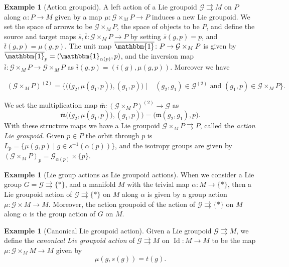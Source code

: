 \documentclass[12pt,a4paper,reqno]{amsart}
\DeclareMathOperator{\Id}{Id}
\newcommand{\1}{\mathbbm{1}} %
\newcommand{\G}{\mathcal{G}} %
\newcommand{\m}{\mathfrak{m}} %
\theoremstyle{definition}
\newtheorem{example}[thm]{Example}
\theoremstyle{TheoremNum}
\begin{document}
\begin{example}[Action groupoid]
A left action of a Lie groupoid $\G\rightrightarrows M$ on $P$ along $\alpha\colon P\to M$ given by a map $\mu\colon \G\times_M P\to P$ induces a new Lie groupoid. We set the space of arrows to be $\G\times_M P$, the space of objects to be $P$, and define the source and target maps $\overline{s},\overline{t}\colon \G\times_M P\to P$ by setting $\overline{s}(g,p) = p$, and $\overline{t}(g,p) =\mu(g,p)$. The unit map $\overline{\1}\colon P\to \G\times_M P$ is given by $\overline{\1}_p = (\1_{\alpha(p)},p)$, and the inversion map $\overline{i}\colon \G\times_M P\to \G\times_M P$ as $\overline{i}(g,p) = (i(g),\mu(g,p))$. Moreover we have
\begin{linenomath}
\begin{align*}
(\G\times_M P)^{(2)} = \bigg\{\Big(\big(g_2,\mu(g_1,p)\big),(g_1,p)\Big)\mid& (g_2,g_1) \in \G^{(2)}\mbox{ and } (g_1,p)\in \G\times_M P\bigg\}. 
\end{align*}
\end{linenomath}

We set the multiplication map $\overline{\m}\colon(\G\times_M P)^{(2)}\to \G$ as 
\[
\overline{\m}\Big(\big(g_2,\mu(g_1,p)\big),(g_1,p)\Big) = \big(\m(g_2,g_1),p\big).
\] 
With these structure maps we have a Lie groupoid $\G\times_M P\rightrightarrows P$, called the \emph{action Lie groupoid}. Given $p\in P$ the orbit through $p$ is $L_p = \{\mu(g,p)\mid g\in s^{-1}(\alpha(p))\}$, and the isotropy groups are given by $(\G\times_M P)_p = \G_{\alpha(p)}\times \{p\}$. 
\end{example}

\begin{example}[Lie group actions as Lie groupoid actions]
When we consider a Lie group $G=\G\rightrightarrows \{\ast\}$,  and a manifold $M$ with the trivial map $\alpha \colon M\to \{\ast\}$, then a Lie groupoid action of $\G\rightrightarrows \{\ast\}$ on $M$ along $\alpha$ is given by a group action $\mu\colon \G\times M\to M$. Moreover, the action groupoid of the action of $\G\rightrightarrows \{\ast\}$ on $M$ along $\alpha$ is the group action of $G$ on $M$. 
\end{example}

\begin{example}[Canonical Lie groupoid action]\th\label{E: canonical Lie groupoid action}
Given a Lie groupoid $\G\rightrightarrows M$, we define the \emph{canonical Lie groupoid action} of $\G\rightrightarrows M$ on $\Id\colon M\to M$ to be the map $\mu\colon \G\times_M M\to M $ given by 
\[
\mu(g,s(g)) = t(g).
\]
\end{example}
\end{document}
